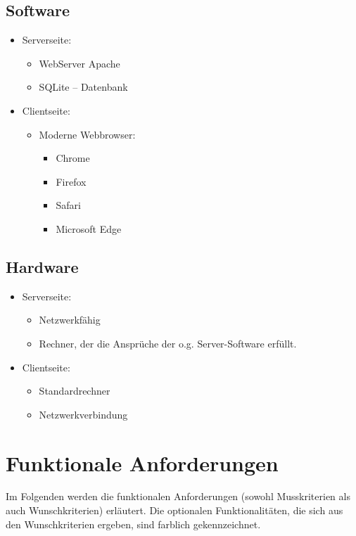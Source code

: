 \documentclass[parskip=full,11pt]{scrartcl}
\begin{document}
\subsection{Software}
\begin{itemize}[itemsep=0pt]
\item Serverseite:
	\begin{itemize}
	\item WebServer Apache 
	\item SQLite – Datenbank
	\end{itemize}
\item Clientseite:
	\begin{itemize}
	\item Moderne Webbrowser:
		\begin{itemize}
		\item Chrome
		\item Firefox
		\item Safari
		\item Microsoft Edge
		\end{itemize}
	
	\end{itemize}
\end{itemize}
\newpage
\subsection{Hardware}
\begin{itemize}[itemsep=0pt]

	\item Serverseite:
	\begin{itemize}
	\item Netzwerkfähig
	\item Rechner, der die Ansprüche der o.g. Server-Software erfüllt.
	\end{itemize}
	\item Clientseite:
	\begin{itemize}
	\item Standardrechner
	\item Netzwerkverbindung
	\end{itemize}
\end{itemize}
\section{Funktionale Anforderungen}
Im Folgenden werden die funktionalen Anforderungen (sowohl Musskriterien als auch Wunschkriterien) erläutert. Die optionalen Funktionalitäten, die sich aus den Wunschkriterien ergeben, sind \colorbox{shadecolor}{farblich gekennzeichnet}.
\end{document}

